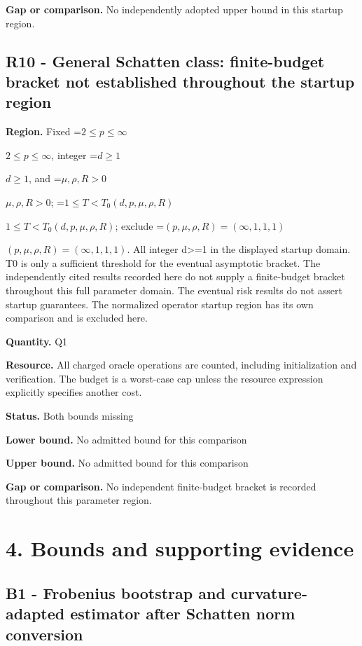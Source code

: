 \documentclass[10pt,a4paper]{article}
\newcommand{\AtlasMath}[1]{\par\begingroup\centering\setbox0=\hbox{$\displaystyle #1$}\ifdim\wd0>1.4\linewidth\typeout{ATLAS WIDE FORMULA: \the\wd0}\fi\ifdim\wd0>\linewidth\resizebox{\linewidth}{!}{\box0}\else\box0\fi\par\endgroup}
\newcommand{\AtlasInlineMath}[1]{\begingroup\setbox0=\hbox{$#1$}\ifdim\wd0>.4\linewidth\endgroup\AtlasMath{#1}\else\endgroup$#1$\fi}
\begin{document}
\textbf{Gap or comparison.} No independently adopted upper bound in this startup region.



\subsection{R10 - General Schatten class: finite-budget bracket not established throughout the startup region}


\textbf{Region.} Fixed \AtlasInlineMath{2\le p\le\infty}, integer \AtlasInlineMath{d\ge1}, and \AtlasInlineMath{\mu,\rho,R>0}; \AtlasInlineMath{1\le T<T_0(d,p,\mu,\rho,R)}; exclude \AtlasInlineMath{(p,\mu,\rho,R)=(\infty,1,1,1)}. All integer d>=1 in the displayed startup domain. T0 is only a sufficient threshold for the eventual asymptotic bracket. The independently cited results recorded here do not supply a finite-budget bracket throughout this full parameter domain. The eventual risk results do not assert startup guarantees. The normalized operator startup region has its own comparison and is excluded here.



\textbf{Quantity.} Q1



\textbf{Resource.} All charged oracle operations are counted, including initialization and verification. The budget is a worst-case cap unless the resource expression explicitly specifies another cost.



\textbf{Status.} Both bounds missing



\textbf{Lower bound.} No admitted bound for this comparison



\textbf{Upper bound.} No admitted bound for this comparison



\textbf{Gap or comparison.} No independent finite-budget bracket is recorded throughout this parameter region.



\section{4. Bounds and supporting evidence}


\subsection{B1 - Frobenius bootstrap and curvature-adapted estimator after Schatten norm conversion}
\end{document}
